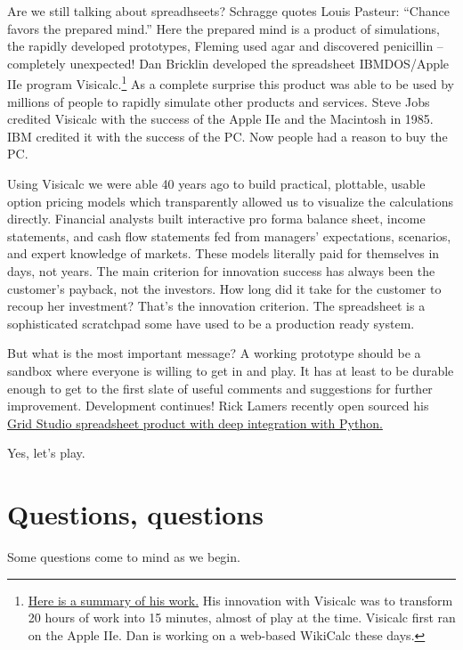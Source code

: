 \documentclass[
]{book}
\begin{document}
Are we still talking about spreadhseets? Schragge quotes Louis Pasteur: ``Chance favors the prepared mind.'' Here the prepared mind is a product of simulations, the rapidly developed prototypes, Fleming used agar and discovered penicillin -- completely unexpected! Dan Bricklin developed the spreadsheet IBMDOS/Apple IIe program Visicalc.\footnote{\href{https://en.wikipedia.org/wiki/Dan_Bricklin}{Here is a summary of his work.} His innovation with Visicalc was to transform 20 hours of work into 15 minutes, almost of play at the time. Visicalc first ran on the Apple IIe. Dan is working on a web-based WikiCalc these days.} As a complete surprise this product was able to be used by millions of people to rapidly simulate other products and services. Steve Jobs credited Visicalc with the success of the Apple IIe and the Macintosh in 1985. IBM credited it with the success of the PC. Now people had a reason to buy the PC.

Using Visicalc we were able 40 years ago to build practical, plottable, usable option pricing models which transparently allowed us to visualize the calculations directly. Financial analysts built interactive pro forma balance sheet, income statements, and cash flow statements fed from managers' expectations, scenarios, and expert knowledge of markets. These models literally paid for themselves in days, not years. The main criterion for innovation success has always been the customer's payback, not the investors. How long did it take for the customer to recoup her investment? That's the innovation criterion. The spreadsheet is a sophisticated scratchpad some have used to be a production ready system.

But what is the most important message? A working prototype should be a sandbox where everyone is willing to get in and play. It has at least to be durable enough to get to the first slate of useful comments and suggestions for further improvement. Development continues! Rick Lamers recently open sourced his \href{https://github.com/ricklamers/gridstudio?ref=hackernoon.com}{Grid Studio spreadsheet product with deep integration with Python.}

Yes, let's play.

\hypertarget{questions-questions}{%
\section{Questions, questions}\label{questions-questions}}

Some questions come to mind as we begin.
\end{document}
